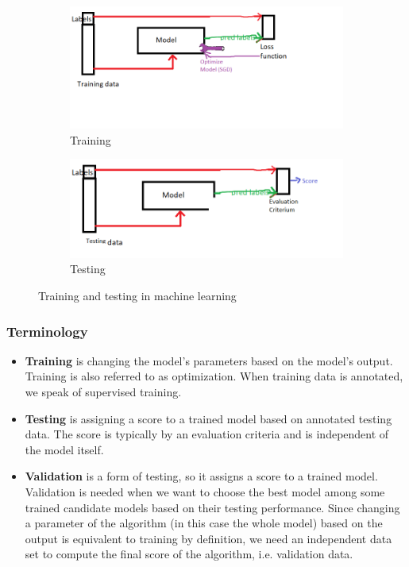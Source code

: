 		\begin{figure}
			\centering
			\begin{subfigure}[b]{0.55\textwidth}
				\includegraphics[scale=1]{images/training_intro.png}
				\caption{Training}
			\end{subfigure}
			\begin{subfigure}[b]{0.55\textwidth}
				\includegraphics[scale=1]{images/testing_intro.png}
				\caption{Testing}
			\end{subfigure}
			\caption{Training and testing in machine learning}
			\label{fig:machine_learning_intro}
		\end{figure}				
		
		
		\subsubsection{Terminology}
			\begin{itemize} 
				\item \textbf{Training} is changing the model's parameters based on the model's output. Training is also referred to as optimization. When training data is annotated, we speak of supervised training. 
				\item \textbf{Testing} is assigning a score to a trained model based on annotated testing data. The score is typically by an evaluation criteria and is independent of the model itself. 
				\item \textbf{Validation} is a form of testing, so it assigns a score to a trained model. Validation is needed when we want to choose the best model among some trained candidate models based on their testing performance. Since changing a parameter of the algorithm (in this case the whole model) based on the output is equivalent to training by definition, we need an independent data set to compute the final score of the algorithm, i.e. validation data. 
			\end{itemize}				
			

